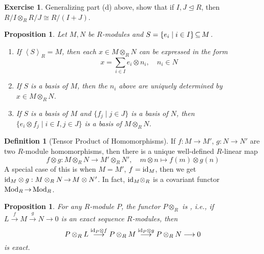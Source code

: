 \documentclass[11pt]{book}
\newcounter{counter}
\newtheorem{proposition}[counter]{Proposition}   \newtheorem{problem}[counter]{Problem}   \newtheorem*{proposition*}{Proposition}   \newtheorem*{lemma*}{Lemma}
\theoremstyle{definition}   \newtheorem{defn}[counter]{Definition} %
\newtheorem*{exercise*}{Exercise}
\newcommand{\nsg}{\mathrel{\unlhd}}   \newcommand{\ind}{\parindent24pt}   \newcommand{\vn}{\varnothing}    \newcommand{\lar}{\longrightarrow}
\newcommand{\gen}[1]{\left\langle #1 \right\rangle}   \newcommand{\stab}[2]{\tn{Stab}_{#1}(#2)}   \newcommand{\fix}[2]{\tn{Fix}_{#1}(#2)}   \newcommand{\op}{^{\tn{op}}}
\DeclareMathOperator{\ra}{\rightarrow}   \DeclareMathOperator{\Poly}{\mathbf{P}}   \DeclareMathOperator{\spn}{\textnormal{span}}   \DeclareMathOperator{\aut}{\textnormal{Aut}}
\newcommand{\vs}{\vspace{8pt}}   \newcommand{\hs}{\hspace{8pt}}
\numberwithin{counter}{chapter}
\begin{document}
\begin{exercise*}
Generalizing part (d) above, show that if $I,J \nsg R$, then $R/I \otimes_R R/J \cong R/(I+J)$. 
\end{exercise*}

\vs

\begin{proposition}
Let $M,N$ be $R$-modules and $S = \{e_i \mid i \in I\} \operatorname{\subseteq} M$.
\begin{enumerate}
\item[(a)] If $\gen{S}_R = M$, then each $x \in M \otimes_R N$ can be expressed in the form
	\[x = \sum_{i \in I} e_i \otimes n_i, \quad n_i \in N \]
\item[(b)] If $S$ is a basis of $M$, then the $n_i$ above are uniquely determined by $x \in M \otimes_R N$. 
\item[(c)] If $S$ is a basis of $M$ and $\{f_j \mid j \in J\}$ is a basis of $N$, then $\{e_i \otimes f_j \mid i \in I, j \in J\}$ is a basis of $M \otimes_R N$. 
\end{enumerate}
\end{proposition}

\vs

\begin{defn}[Tensor Product of Homomorphisms]
If $f : M \ra M'$, $g : N \ra N'$ are two $R$-module homomorphisms, then there is a unique well-defined $R$-linear map 
	\[f \otimes g : M \otimes_R N \ra M' \otimes_R N', \quad m \otimes n \mapsto f(m) \otimes g(n) \]
A special case of this is when $M = M'$, $f = \textnormal{id}_M$, then we get $\id_M \otimes g : M \otimes_R N \ra M\otimes N'$. In fact, $\textnormal{id}_M \otimes_R$ is a covariant functor $\tn{Mod}_R \ra \tn{Mod}_R$. 
\end{defn}

\vs

\begin{proposition}
For any $R$-module $P$, the functor $P \otimes_R$ is , i.e., if $L \overset{f}{\lar} M \overset{g}{\lar} N \lar 0$ is an exact sequence $R$-modules, then 
	\[P \otimes_R L \overset{\id_P \otimes f}{\lar} P \otimes_R M \overset{\id_P \otimes g}{\lar} P \otimes_R N \lar 0 \]
is exact. 
\end{proposition}
\end{document}
